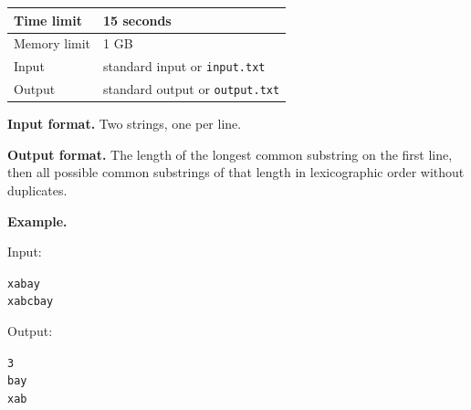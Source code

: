 

\begin{table}[!ht]
\centering
\begin{tabular}{|l|l|}
\hline
Time limit & 15 seconds \\
\hline
Memory limit & 1 GB \\
\hline
Input & standard input or \texttt{input.txt} \\
\hline
Output & standard output or \texttt{output.txt} \\
\hline
\end{tabular}
\end{table}

{\bfseries Input format.} Two strings, one per line.

{\bfseries Output format.} The length of the longest common substring on the first line,
then all possible common substrings of that length in lexicographic order without duplicates.

{\bfseries Example.}

Input:
\begin{alltt}
xabay
xabcbay
\end{alltt}

Output:
\begin{alltt}
3
bay
xab
\end{alltt}

\pagebreak
